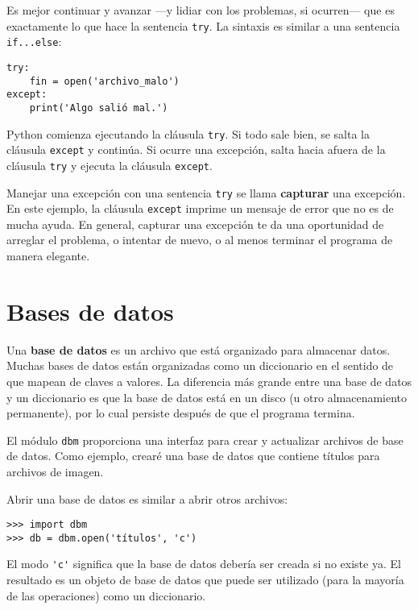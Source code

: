 \documentclass[10pt]{book}
\begin{document}
Es mejor continuar y avanzar ---y lidiar con los problemas, si
ocurren--- que es exactamente lo que hace la sentencia {\tt try}.  La
sintaxis es similar a una sentencia {\tt if...else}:

\begin{verbatim}
try:
    fin = open('archivo_malo')
except:
    print('Algo salió mal.')
\end{verbatim}
%
Python comienza ejecutando la cláusula {\tt try}.  Si todo sale
bien, se salta la cláusula {\tt except} y continúa.  Si ocurre
una excepción, salta hacia afuera de la cláusula {\tt try} y
ejecuta la cláusula {\tt except}.

Manejar una excepción con una sentencia {\tt try} se llama {\bf
capturar} una excepción.  En este ejemplo, la cláusula {\tt except}
imprime un mensaje de error que no es de mucha ayuda.  En general,
capturar una excepción te da una oportunidad de arreglar el problema, o intentar
de nuevo, o al menos terminar el programa de manera elegante.


\section{Bases de datos}

Una {\bf base de datos} es un archivo que está organizado para almacenar datos.  Muchas
bases de datos están organizadas como un diccionario en el sentido de que mapean
de claves a valores.  La diferencia más grande entre una base de datos y un
diccionario es que la base de datos está en un disco (u otro almacenamiento
permanente), por lo cual persiste después de que el programa termina.  

El módulo {\tt dbm} proporciona una interfaz para crear
y actualizar archivos de base de datos.
Como ejemplo, crearé una base de datos
que contiene títulos para archivos de imagen.

Abrir una base de datos es similar a abrir otros archivos:

\begin{verbatim}
>>> import dbm
>>> db = dbm.open('títulos', 'c')
\end{verbatim}
%
El modo \verb"'c'" significa que la base de datos debería ser creada si
no existe ya.  El resultado es un objeto de base de datos
que puede ser utilizado (para la mayoría de las operaciones) como un diccionario.
\end{document}
